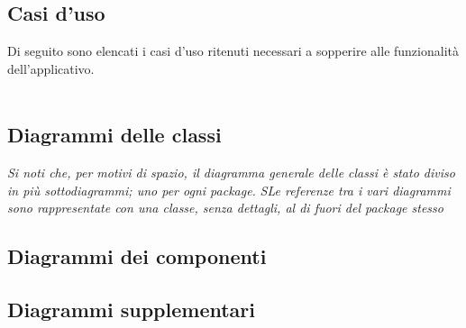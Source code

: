 \subsection{Casi d'uso}
Di seguito sono elencati i casi d'uso ritenuti necessari a sopperire alle funzionalità
dell'applicativo.
\\\\





\pagebreak


\pagebreak
\subsection{Diagrammi delle classi}

\textit{Si noti che, per motivi di spazio, il diagramma generale delle classi è stato diviso in più sottodiagrammi; uno per ogni package.}
\textit{SLe referenze tra i vari diagrammi sono rappresentate con una classe, senza dettagli, al di fuori del package stesso}






\pagebreak
\subsection{Diagrammi dei componenti}


\pagebreak
\subsection{Diagrammi supplementari}

\pagebreak

\pagebreak

